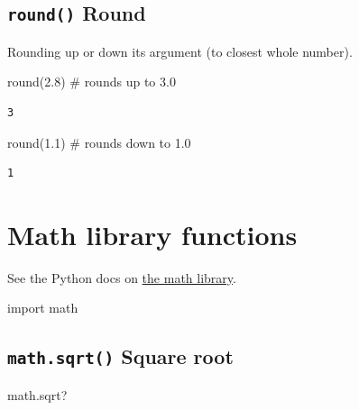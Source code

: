 \documentclass[
  letterpaper,
  DIV=11,
  numbers=noendperiod]{scrreprt}
\newenvironment{Shaded}{\begin{snugshade}}{\end{snugshade}}
\newcommand{\BuiltInTok}[1]{\textcolor[rgb]{0.00,0.23,0.31}{#1}}
\newcommand{\CommentTok}[1]{\textcolor[rgb]{0.37,0.37,0.37}{#1}}
\newcommand{\FloatTok}[1]{\textcolor[rgb]{0.68,0.00,0.00}{#1}}
\newcommand{\ImportTok}[1]{\textcolor[rgb]{0.00,0.46,0.62}{#1}}
\newcommand{\NormalTok}[1]{\textcolor[rgb]{0.00,0.23,0.31}{#1}}
\begin{document}
\hypertarget{round-round}{%
\section{\texorpdfstring{\texttt{round()}
Round}{round() Round}}\label{round-round}}

Rounding up or down its argument (to closest whole number).

\begin{Shaded}
\begin{Highlighting}[]
\BuiltInTok{round}\NormalTok{(}\FloatTok{2.8}\NormalTok{) }\CommentTok{\# rounds up to 3.0}
\end{Highlighting}
\end{Shaded}

\begin{verbatim}
3
\end{verbatim}

\begin{Shaded}
\begin{Highlighting}[]
\BuiltInTok{round}\NormalTok{(}\FloatTok{1.1}\NormalTok{) }\CommentTok{\# rounds down to 1.0}
\end{Highlighting}
\end{Shaded}

\begin{verbatim}
1
\end{verbatim}

\hypertarget{math-library-functions}{%
\chapter{Math library functions}\label{math-library-functions}}

See the Python docs on
\href{https://docs.python.org/3/library/math.html}{the math library}.

\begin{Shaded}
\begin{Highlighting}[]
\ImportTok{import}\NormalTok{ math}
\end{Highlighting}
\end{Shaded}

\hypertarget{math.sqrt-square-root}{%
\section{\texorpdfstring{\texttt{math.sqrt()} Square
root}{math.sqrt() Square root}}\label{math.sqrt-square-root}}

\begin{Shaded}
\begin{Highlighting}[]
\NormalTok{math.sqrt?}
\end{Highlighting}
\end{Shaded}
\end{document}
